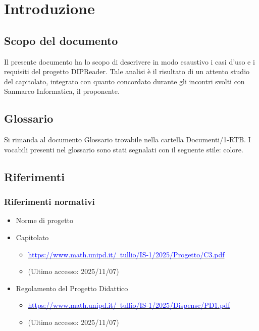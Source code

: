 \documentclass[a4paper,12pt]{article}
\begin{document}
    \section{Introduzione} {
        \subsection{Scopo del documento}
        
            Il presente documento ha lo scopo di descrivere in modo esaustivo i casi d’uso e i requisiti del progetto DIPReader.
            Tale analisi è il risultato di un attento studio del capitolato, integrato con quanto concordato durante gli incontri svolti con Sanmarco Informatica, il proponente.

        \subsection{Glossario}
            Si rimanda al documento Glossario trovabile nella cartella Documenti/1-RTB. I vocabili presenti nel glossario sono stati segnalati con il seguente stile: colore. 
        \subsection{Riferimenti}
            \subsubsection{Riferimenti normativi}
                \begin{itemize}
                    \item Norme di progetto
                    \item Capitolato
                    \begin{itemize}
                        \item \href{https://www.math.unipd.it/~tullio/IS-1/2025/Progetto/C3.pdf}{\textcolor{blue} {https://www.math.unipd.it/~tullio/IS-1/2025/Progetto/C3.pdf}}
                        \item[] (Ultimo accesso: 2025/11/07)
                    \end{itemize}
                    \item Regolamento del Progetto Didattico
                    \begin{itemize}
                        \item \href{https://www.math.unipd.it/~tullio/IS-1/2025/Dispense/PD1.pdf}{\textcolor{blue} {https://www.math.unipd.it/~tullio/IS-1/2025/Dispense/PD1.pdf}}
                        \item[] (Ultimo accesso: 2025/11/07)
                    \end{itemize}
                \end{itemize}
}
\end{document}
